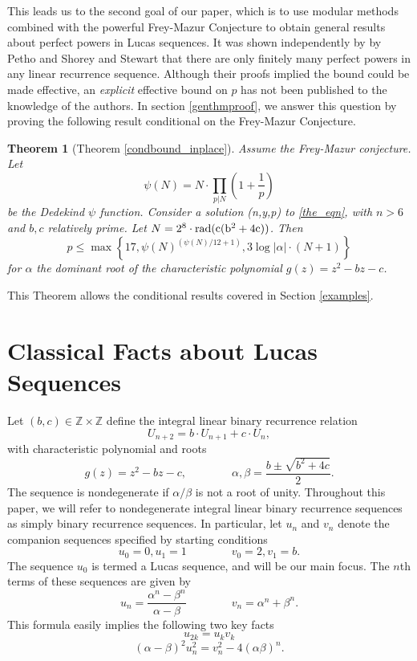 \documentclass[12pt]{amsart}
\newtheorem{ithm}{Theorem}
\theoremstyle{definition}
\def\Z{{\mathbb Z}}
\newcommand{\rad}{\rm rad}
\begin{document}
This leads us to the second goal of our paper, which is to use modular methods combined with the powerful Frey-Mazur Conjecture to obtain general results about perfect powers in Lucas sequences. It was shown independently by by Petho \cite{petho82} and Shorey and Stewart \cite{shorey83} that there are only finitely many perfect powers in any linear recurrence sequence.  Although their proofs implied the bound could be made effective, an \emph{explicit} effective bound on $p$ has not been published to the knowledge of the authors.  In section \ref{genthmproof}, we answer this question by proving the following result conditional on the Frey-Mazur Conjecture.

\begin{ithm}[Theorem \ref{condbound_inplace}]\label{condbound}
Assume the Frey-Mazur conjecture.  Let 
\[ \psi(N) = N \cdot \prod_{p|N} \left( 1 + \frac{1}{p} \right)\]
be the Dedekind $\psi$ function.  Consider a solution (n,y,p) to \eqref{the_eqn}, with $n > 6$ and $b,c$ relatively prime. Let $N = 2^8 \cdot \rad(c(b^2+4c))$. Then 
\[ p \leq \max\left\{17,   \psi(N)^{(\psi(N)/12+1)}, 3\log{|\alpha|} \cdot ( N+1)  \right\} \]
for $\alpha$ the dominant root of the characteristic polynomial $g(z) = z^2 -bz-c$.
\end{ithm}
This Theorem allows the conditional results covered in Section \ref{examples}.

\section{Classical Facts about Lucas Sequences}\label{classicalresults}


Let $(b,c) \in \Z \times \Z$ define the integral linear binary recurrence relation
\[ U_{n+2} = b\cdot U_{n+1}+ c\cdot U_n, \]
with characteristic polynomial and roots
\[ g(z) = z^2 - bz - c, \qquad \qquad \alpha, \beta = \frac{b \pm \sqrt{b^2+4c}}{2}.\]
The sequence is nondegenerate if $\alpha/\beta$ is not a root of unity.  Throughout this paper, we will refer to nondegenerate integral linear binary recurrence sequences as simply binary recurrence sequences.  In particular, let $u_n$ and $v_n$ denote the companion sequences specified by starting conditions
\[ u_0 = 0, u_1 = 1 \qquad \qquad v_0 = 2, v_1 = b .\]
The sequence $u_0$ is termed a Lucas sequence, and will be our main focus.  The $n$th terms of these sequences are given by 
\begin{equation}\label{binetform} u_n = \frac{\alpha^n - \beta^n}{\alpha - \beta} \qquad \qquad v_n = \alpha^n +\beta^n. \end{equation}
This formula easily implies the following two key facts
\begin{equation}\label{fib2} u_{2k} = u_kv_k \end{equation}
\begin{equation}\label{gen_diophan}(\alpha - \beta)^2u_n^2 = v_n^2 - 4(\alpha\beta)^n. \end{equation}
\end{document}
